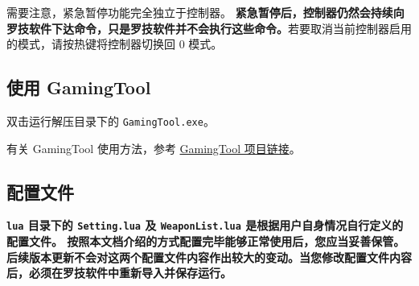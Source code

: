 需要注意，紧急暂停功能完全独立于控制器。
\textbf{\color{red}紧急暂停后，控制器仍然会持续向罗技软件下达命令，只是罗技软件并不会执行这些命令。}若要取消当前控制器启用的模式，请按热键将控制器切换回 0 模式。

\subsection{使用 GamingTool}

双击运行解压目录下的 \lstinline{GamingTool.exe}。

有关 GamingTool 使用方法，参考 \href{https://gitee.com/silver1867/gaming-tool}{GamingTool 项目链接}。

\subsection{配置文件}

\textbf{\color{red}\lstinline{lua} 目录下的 \lstinline{Setting.lua} 及 \lstinline{WeaponList.lua} 是根据用户自身情况自行定义的配置文件。
按照本文档介绍的方式配置完毕能够正常使用后，您应当妥善保管。后续版本更新不会对这两个配置文件内容作出较大的变动。当您修改配置文件内容后，必须在罗技软件中重新导入并保存运行。}
